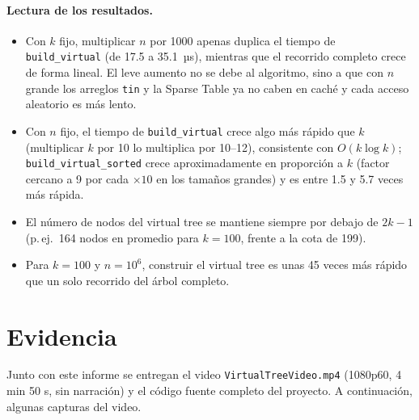 \documentclass[11pt,a4paper]{article}
\theoremstyle{plain}
\begin{document}
\paragraph{Lectura de los resultados.}
\begin{itemize}
  \item Con $k$ fijo, multiplicar $n$ por 1000 apenas duplica el tiempo de
        \texttt{build\_virtual} (de 17.5 a 35.1~µs), mientras que el recorrido completo crece
        de forma lineal. El leve aumento no se debe al algoritmo, sino a que con $n$ grande
        los arreglos \texttt{tin} y la Sparse Table ya no caben en caché y cada acceso
        aleatorio es más lento.
  \item Con $n$ fijo, el tiempo de \texttt{build\_virtual} crece algo más rápido que $k$
        (multiplicar $k$ por 10 lo multiplica por 10--12), consistente con $O(k \log k)$;
        \texttt{build\_virtual\_sorted} crece aproximadamente en proporción a $k$ (factor
        cercano a 9 por cada $\times 10$ en los tamaños grandes) y es entre 1.5 y 5.7 veces
        más rápida.
  \item El número de nodos del virtual tree se mantiene siempre por debajo de $2k-1$
        (p.\,ej.\ 164 nodos en promedio para $k=100$, frente a la cota de 199).
  \item Para $k=100$ y $n=10^6$, construir el virtual tree es unas 45 veces más rápido que
        un solo recorrido del árbol completo.
\end{itemize}

\section{Evidencia}

Junto con este informe se entregan el video \texttt{VirtualTreeVideo.mp4} (1080p60,
4 min 50 s, sin narración) y el código fuente completo del proyecto. A continuación, algunas
capturas del video.
\end{document}
